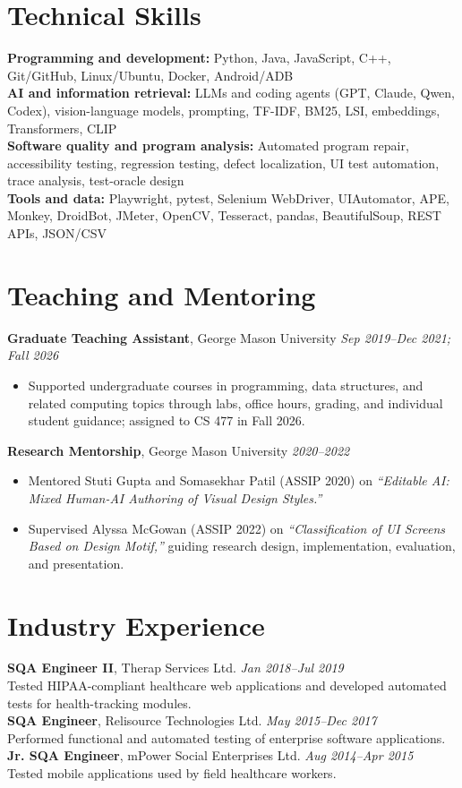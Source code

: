 \documentclass[a4paper,10pt]{article}
\begin{document}
\section{Technical Skills}
\textbf{Programming and development:} Python, Java, JavaScript, C++, Git/GitHub, Linux/Ubuntu, Docker, Android/ADB\\
\textbf{AI and information retrieval:} LLMs and coding agents (GPT, Claude, Qwen, Codex), vision-language models, prompting, TF-IDF, BM25, LSI, embeddings, Transformers, CLIP\\
\textbf{Software quality and program analysis:} Automated program repair, accessibility testing, regression testing, defect localization, UI test automation, trace analysis, test-oracle design\\
\textbf{Tools and data:} Playwright, pytest, Selenium WebDriver, UIAutomator, APE, Monkey, DroidBot, JMeter, OpenCV, Tesseract, pandas, BeautifulSoup, REST APIs, JSON/CSV

\section{Teaching and Mentoring}
\textbf{Graduate Teaching Assistant}, George Mason University \hfill \textit{Sep 2019--Dec 2021; Fall 2026}
\begin{itemize}
\item Supported undergraduate courses in programming, data structures, and related computing topics through labs, office hours, grading, and individual student guidance; assigned to CS 477 in Fall 2026.
\end{itemize}
\textbf{Research Mentorship}, George Mason University \hfill \textit{2020--2022}
\begin{itemize}
\item Mentored Stuti Gupta and Somasekhar Patil (ASSIP 2020) on \textit{``Editable AI: Mixed Human-AI Authoring of Visual Design Styles.''}
\item Supervised Alyssa McGowan (ASSIP 2022) on \textit{``Classification of UI Screens Based on Design Motif,''} guiding research design, implementation, evaluation, and presentation.
\end{itemize}

\section{Industry Experience}
\textbf{SQA Engineer II}, Therap Services Ltd. \hfill \textit{Jan 2018--Jul 2019}\\
Tested HIPAA-compliant healthcare web applications and developed automated tests for health-tracking modules.\\
\textbf{SQA Engineer}, Relisource Technologies Ltd. \hfill \textit{May 2015--Dec 2017}\\
Performed functional and automated testing of enterprise software applications.\\
\textbf{Jr. SQA Engineer}, mPower Social Enterprises Ltd. \hfill \textit{Aug 2014--Apr 2015}\\
Tested mobile applications used by field healthcare workers.
\end{document}
